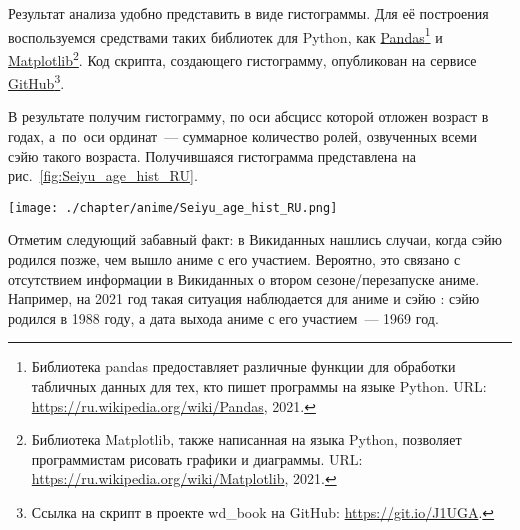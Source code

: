 \newpage
Результат анализа удобно представить в виде гистограммы. 
Для её построения воспользуемся средствами таких библиотек для Python, 
как \href{https://ru.wikipedia.org/wiki/Pandas}{Pandas}\footnote[][-\baselineskip]{%
%
    Библиотека pandas предоставляет различные функции для обработки табличных данных 
    для тех, кто пишет программы на языке Python. 
    URL: \href{https://ru.wikipedia.org/wiki/Pandas}{https://ru.wikipedia.org/wiki/Pandas}, 2021.%
%
} 
и \href{https://ru.wikipedia.org/wiki/Matplotlib}{Matplotlib}\footnote{%
%   
    Библиотека Matplotlib, также написанная на языка Python, 
    позволяет программистам рисовать графики и диаграммы. 
    URL: \href{https://ru.wikipedia.org/wiki/Matplotlib}{https://ru.wikipedia.org/wiki/Matplotlib}, 2021.%
%
}. Код скрипта, создающего гистограмму, 
опубликован на сервисе \href{https://git.io/J1UGA}{GitHub}\footnote{%
    Ссылка на скрипт в проекте wd\_book на GitHub: \href{https://git.io/J1UGA}{https://git.io/J1UGA}.%
}.


В результате получим гистограмму, по оси абсцисс которой отложен возраст в годах, 
а~по~оси ординат~--- суммарное количество ролей, озвученных всеми сэйю такого возраста. Получившаяся гистограмма представлена на рис.~\ref{fig:Seiyu_age_hist_RU}. 

\begin{figure*}[h!]
    \texttt{[image: ./chapter/anime/Seiyu\_age\_hist\_RU.png]}%
	\caption[Гистограмма числа аниме, озвученных сэйю разных возрастов, 2021 года.]{Гистограмма с числом аниме, озвученных сэйю разных возрастов, 2021 год. Гистограмма построена на~основе данных, полученных с помощью запросов~\protect\ref{lst:seiyu_bd_w_service} (или~\protect\ref{lst:seiyu_bd_w_rdfs}), \protect\ref{lst:all_anime_releases} и \protect\ref{lst:link_anime_seiyu}.}%
    \label{fig:Seiyu_age_hist_RU}%
\end{figure*} 


\newpage
Отметим следующий забавный факт: в Викиданных нашлись случаи, когда сэйю родился позже, чем вышло аниме с его участием. Вероятно, это связано с отсутствием информации в Викиданных о втором сезоне/перезапуске аниме. Например, на 2021 год такая ситуация наблюдается для аниме  и сэйю : сэйю родился в 1988 году, а дата выхода аниме с его участием~--- 1969 год.

